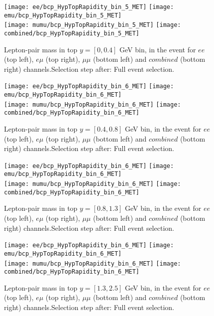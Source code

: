 \documentclass[12pt, a4paper, titlepage]{article}
\begin{document}
\begin{figure}
  \texttt{[image: ee/bcp\_HypTopRapidity\_bin\_5\_MET]}
  \texttt{[image: emu/bcp\_HypTopRapidity\_bin\_5\_MET]}\\
  \texttt{[image: mumu/bcp\_HypTopRapidity\_bin\_5\_MET]}
  \texttt{[image: combined/bcp\_HypTopRapidity\_bin\_5\_MET]}
\caption{Lepton-pair mass in top $y = [0,0.4]$ GeV bin, in the event for $ee$ (top left), $e\mu$ (top right), $\mu\mu$ (bottom left) and $combined$ (bottom right) channels.\newline Selection step after: Full event selection.}
\end{figure}

\clearpage
\newpage

\begin{figure}
  \texttt{[image: ee/bcp\_HypTopRapidity\_bin\_6\_MET]}
  \texttt{[image: emu/bcp\_HypTopRapidity\_bin\_6\_MET]}\\
  \texttt{[image: mumu/bcp\_HypTopRapidity\_bin\_6\_MET]}
  \texttt{[image: combined/bcp\_HypTopRapidity\_bin\_6\_MET]}
\caption{Lepton-pair mass in top $y = [0.4,0.8]$ GeV bin, in the event for $ee$ (top left), $e\mu$ (top right), $\mu\mu$ (bottom left) and $combined$ (bottom right) channels.\newline Selection step after: Full event selection.}
\end{figure}

\clearpage
\newpage
\begin{figure}
  \texttt{[image: ee/bcp\_HypTopRapidity\_bin\_6\_MET]}
  \texttt{[image: emu/bcp\_HypTopRapidity\_bin\_6\_MET]}\\
  \texttt{[image: mumu/bcp\_HypTopRapidity\_bin\_6\_MET]}
  \texttt{[image: combined/bcp\_HypTopRapidity\_bin\_6\_MET]}
\caption{Lepton-pair mass in top $y = [0.8,1.3]$ GeV bin, in the event for $ee$ (top left), $e\mu$ (top right), $\mu\mu$ (bottom left) and $combined$ (bottom right) channels.\newline Selection step after: Full event selection.}
\end{figure}

\clearpage
\newpage
\begin{figure}
  \texttt{[image: ee/bcp\_HypTopRapidity\_bin\_6\_MET]}
  \texttt{[image: emu/bcp\_HypTopRapidity\_bin\_6\_MET]}\\
  \texttt{[image: mumu/bcp\_HypTopRapidity\_bin\_6\_MET]}
  \texttt{[image: combined/bcp\_HypTopRapidity\_bin\_6\_MET]}
\caption{Lepton-pair mass in top $y = [1.3,2.5]$ GeV bin, in the event for $ee$ (top left), $e\mu$ (top right), $\mu\mu$ (bottom left) and $combined$ (bottom right) channels.\newline Selection step after: Full event selection.}
\end{figure}
\end{document}
